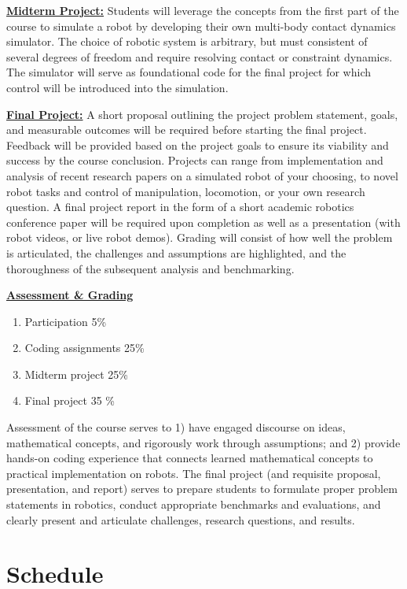 \documentclass[11pt,letterpaper]{article}
\newcommand{\mysec}[1]{\medskip\noindent\underline{\textbf{#1}}}
\begin{document}
\mysec{Midterm Project:} Students will leverage the concepts from the first part of the course to simulate a robot by developing their own multi-body contact dynamics simulator. The choice of robotic system is arbitrary, but must consistent of several degrees of freedom and require resolving contact or constraint dynamics. The simulator will serve as foundational code for the final project for which control will be introduced into the simulation. 

\mysec{Final Project:} A short proposal outlining the project problem statement, goals, and measurable outcomes will be required before starting the final project. Feedback will be provided based on the project goals to ensure its viability and success by the course conclusion.  Projects can range from implementation and analysis of recent research papers on a simulated robot of your choosing, to novel robot tasks and control of manipulation, locomotion, or your own research question. A final project report in the form of a short academic robotics conference paper will be required upon completion as well as a presentation (with robot videos, or live robot demos). Grading will consist of how well the problem is articulated, the challenges and assumptions are highlighted, and the thoroughness of the subsequent analysis and benchmarking.


\mysec{Assessment \& Grading}

\begin{enumerate}[noitemsep]
	\item Participation 5\%
	\item Coding assignments 25\%
	\item Midterm project 25\%
	\item Final project 35 \%
\end{enumerate}


Assessment of the course serves to 1) have engaged discourse on ideas, mathematical concepts, and rigorously work through assumptions; and 2) provide hands-on coding experience that connects learned mathematical concepts to practical implementation on robots. The final project (and requisite proposal, presentation, and report) serves to prepare students to formulate proper problem statements in robotics, conduct appropriate benchmarks and evaluations, and clearly present and articulate challenges, research questions, and results. 

\section*{Schedule}
	
\end{document}

